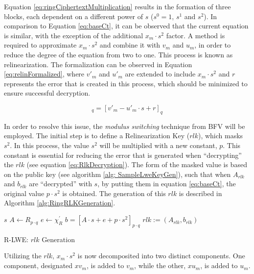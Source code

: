 Equation \ref{eq:ringCiphertextMultiplication} results in the formation of three blocks, each dependent on a different power of $s$ ($s^0=1$, $s^1$ and $s^2$). In comparison to Equation \ref{eq:baseCt}, it can be observed that the current equation is similar, with the exception of the additional $x_m\cdot s^2$ factor. A method is required to approximate $x_m\cdot s^2$ and combine it with $v_m$ and $u_m$, in order to reduce the degree of the equation from two to one. This process is known as relinearization. The formalization can be observed in Equation \ref{eq:relinFormalized}, where $v'_m$ and $u'_m$ are extended to include $x_m\cdot s^2$ and $r$ represents the error that is created in this process, which should be minimized to ensure successful decryption. 

\begin{equation}
  [v_m - u_m\cdot s + x_m \cdot s^2]_q = [v'_m - u'_m\cdot s + r]_q
  \label{eq:relinFormalized}
\end{equation}

In order to resolve this issue, the \textit{modulus switching} technique from BFV will be employed. The initial step is to define a Relinearization Key ($rlk$), which masks $s^2$. In this process, the value $s^2$ will be multiplied with a new constant, $p$. This constant is essential for reducing the error that is generated when ``decrypting'' the $rlk$ (see equation \ref{eq:RlkDecryption}).
The form of the masked value is based on the public key (see algorithm \ref{alg: SampleLweKeyGen}), such that when $A_{rlk}$ and $b_{rlk}$ are ``decrypted'' with $s$, by putting them in equation \ref{eq:baseCt}, the original value $p\cdot s^2$ is obtained. The generation of this $rlk$ is described in Algorithm \ref{alg:RingRLKGeneration}.

\begin{algorithm}[htb]
  \begin{algorithmic}[1]
    \REQUIRE $s$
    \STATE $A \leftarrow R_{p \cdot q}$
    \STATE $e \leftarrow \chi_R^{'}$
    \STATE $b = [A\cdot s+e+p\cdot s^2]_{p \cdot q}$
    \RETURN $rlk:=(A_{rlk}, b_{rlk})$
  \end{algorithmic}
  \caption{R-LWE: $rlk$ Generation}
  \label{alg:RingRLKGeneration}
\end{algorithm}

Utilizing the $rlk$, $x_m\cdot s^2$ is now decomposited into two distinct components. One component, designated $xv_m$, is added to $v_m$, while the other, $xu_m$, is added to $u_m$.

